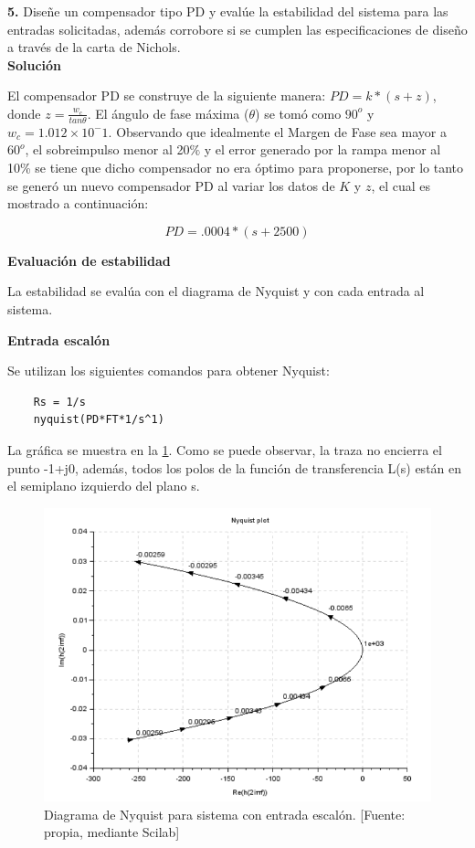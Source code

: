 \documentclass[12pt,letterpaper]{article}
\begin{document}
\bigskip


\textbf{5.} Diseñe un compensador tipo PD y evalúe la estabilidad del sistema para las entradas solicitadas, además corrobore si se cumplen las especificaciones de diseño a través de la carta de Nichols.\\

\textbf{Solución}

\bigskip

El compensador PD se construye de la siguiente manera: $PD = k*(s+z)$, donde $z = \frac{w_{c}}{tan \theta}$. El ángulo de fase máxima ($\theta$) se tomó como $90^{o}$ y $w_{c} = 1.012\times10^-1$. Observando que idealmente el Margen de Fase sea mayor a $60^{o}$, el sobreimpulso menor al 20$\%$ y el error generado por la rampa menor al 10\% se tiene que dicho compensador no era óptimo para proponerse, por lo tanto se generó un nuevo compensador PD al variar los datos de $K$ y $z$, el cual es mostrado a continuación:

\begin{equation}
    PD = .0004 * (s+2500)
\end{equation}

\bigskip

\textbf{Evaluación de estabilidad}

La estabilidad se evalúa con el diagrama de Nyquist y con cada entrada al sistema.

\bigskip

\textbf{Entrada escalón}

Se utilizan los siguientes comandos para obtener Nyquist:

\begin{verbatim}
    Rs = 1/s
    nyquist(PD*FT*1/s^1)
\end{verbatim}

\bigskip

La gráfica se muestra en la \ref{fig:fig5}. Como se puede observar, la traza no encierra el punto -1+j0, además, todos los polos de la función de transferencia L(s) están en el semiplano izquierdo del plano s.

\begin{figure}[hbtp]
	\centering
	\includegraphics[width = 0.75 \columnwidth]{52escalon.png} 
	\caption[Figura3]{Diagrama de Nyquist para sistema con entrada escalón. [Fuente: propia, mediante Scilab]} 
	\label{fig:fig5} 
\end{figure}
\end{document}

